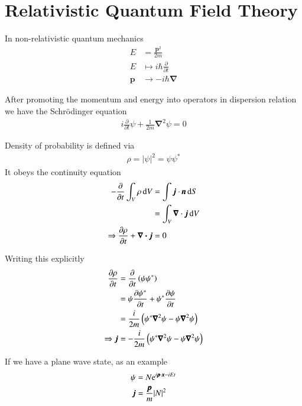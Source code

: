 \chapter{Relativistic Quantum Field Theory}
In non-relativistic quantum mechanics
\begin{align*}
   E &= \frac{\pmb{p}^2}{2m} \\
   E &\mapsto i\hbar \frac{\partial}{\partial t} \\
   \pmb{p} &\rightarrow -i\hbar \pmb{\nabla}
\end{align*}

After promoting the momentum and energy into operators in dispersion relation we have the Schrödinger equation
\begin{align}
   i \frac{\partial}{\partial t} \psi + \frac{1}{2m} \pmb{\nabla}^2 \psi = 0
\end{align}

Density of probability is defined via
\begin{align}
   \rho = |\psi|^2 = \psi \psi^*
\end{align}
It obeys the continuity equation
\begin{align}
   -\frac{\partial}{\partial t } \int_V \rho \dd{V} &= \int \pmb{j} \cdot \pmb{n} \dd{S} \notag\\
                                                    &= \int_V \pmb{\nabla} \cdot \pmb{j} \dd{V} \notag \\
   \Rightarrow \frac{\partial \rho}{\partial t} + \div \pmb{j} &= 0
\end{align}

Writing this explicitly
\begin{align}
   \frac{\partial \rho}{\partial t} &= \frac{\partial }{\partial t} \left( \psi \psi^* \right) \notag\\
                                    &= \psi \frac{\partial \psi^*}{\partial t} + \psi^* \frac{\partial \psi}{\partial t} \notag \\
                                    &= \frac{i}{2m} \left( \psi^* \pmb{\nabla}^2 \psi -  \psi \pmb{\nabla}^2 \psi \right) \notag \\
   \Rightarrow \pmb{j} &= - \frac{i}{2m} \left( \psi^* \pmb{\nabla}^2 \psi -  \psi \pmb{\nabla}^2 \psi \right)
\end{align}

If we have a plane wave state, as an example 
\begin{align*}
   \psi &= N \mathrm{e}^{i\pmb{p}\cdot \pmb{x} - i Et} \\
   \pmb{j} &= \frac{\pmb{p}}{m} |N|^2
\end{align*}

